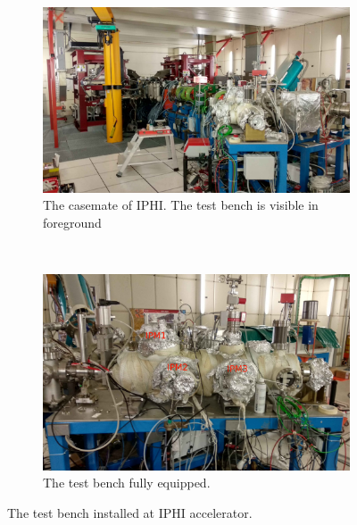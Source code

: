 \begin{figure}[!ht]
	\begin{subfigure}[t]{0.5\textwidth}
		\includegraphics[width=\textwidth]{04_IPHI_Test/figures/fig000_IPHI_tb1.jpg}
		\caption{The casemate of IPHI. The test bench is visible in foreground}
		\label{}
	\end{subfigure}
	~
	\begin{subfigure}[t]{0.5\textwidth}
		\includegraphics[width=\textwidth]{04_IPHI_Test/figures/fig000_IPHI_tb2.jpg}
		\caption{The test bench fully equipped.}
		\label{}
	\end{subfigure}
	\caption[The test bench installed at the IPHI accelerator]{The test bench installed at IPHI accelerator.}
	\label{chap4:IPHI_tb}
\end{figure}
